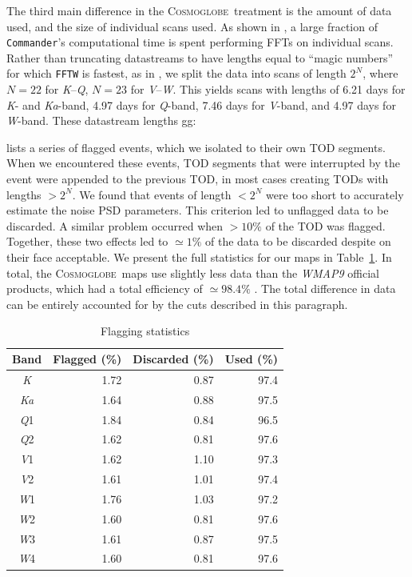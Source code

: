 \documentclass[twocolumn]{../../common/aa}
\def\commander{\texttt{Commander}}
\newcommand{\Cosmoglobe}{\textsc{Cosmoglobe}}
\newcommand{\K}[0]{\textit K}
\newcommand{\Ka}[0]{\textit{Ka}}
\newcommand{\Q}[0]{\textit Q}
\newcommand{\V}[0]{\textit V}
\newcommand{\W}[0]{\textit W}
\begin{document}
The third main difference in the \Cosmoglobe\ treatment is the amount of data used, and the size of individual scans used. 
As shown in \citet{bp03}, a large fraction of \commander's computational time is spent performing FFTs on individual scans. Rather than truncating datastreams to have lengths equal to ``magic numbers'' for which \texttt{FFTW} \citep{FFTW05} is fastest, as in \citet{bp03}, 
we split the data into scans of length $2^N$, where $N=22$ for \K--\Q, $N=23$ for \V--\W. This yields scans with lengths of 6.21 days for \K- and \Ka-band, 4.97 days for \Q-band, 7.46 days for \V-band, and 4.97 days for \W-band.
These datastream lengths gg:

\citet{wmapexsupp} lists a series of flagged events, which we isolated to their own TOD segments. When we encountered these events, TOD segments that were interrupted by the event were appended to the previous TOD, in most cases creating TODs with lengths $>2^N$. We found that events of length $<2^N$ were too short to accurately estimate the noise PSD parameters. This criterion led to unflagged data to be discarded. A similar problem occurred when $>10\%$ of the TOD was flagged. Together, these two effects led to $\simeq1\%$ of the data to be discarded despite on their face acceptable. We present the full statistics for our maps in Table~\ref{table:flagged_data}. In total, the \Cosmoglobe\ maps use slightly less data than the \textit{WMAP9} official products, which had a total efficiency of $\simeq98.4\%$ \citep{bennett2012}. The total difference in data can be entirely accounted for by the cuts described in this paragraph.

\begin{table}
\caption{Flagging statistics}              %
\label{table:flagged_data}      %
\centering                                      %
\begin{tabular}{c r r r}          %
\hline\hline                        %
	Band & Flagged (\%) & Discarded (\%) & Used (\%) \\    %
\hline                                   %
	\K  &  1.72 & 0.87 & 97.4\\
	\Ka &  1.64 & 0.88 & 97.5\\      %
	\Q1 &  1.84 & 0.84 & 96.5\\
	\Q2 &  1.62 & 0.81 & 97.6\\
	\V1 &  1.62 & 1.10 & 97.3\\
	\V2 &  1.61 & 1.01 & 97.4\\
	\W1 &  1.76 & 1.03 & 97.2\\
	\W2 &  1.60 & 0.81 & 97.6\\
	\W3 &  1.61 & 0.87 & 97.5\\
	\W4 &  1.60 & 0.81 & 97.6\\
\hline                                             %
\end{tabular}
\end{table}
\end{document}
